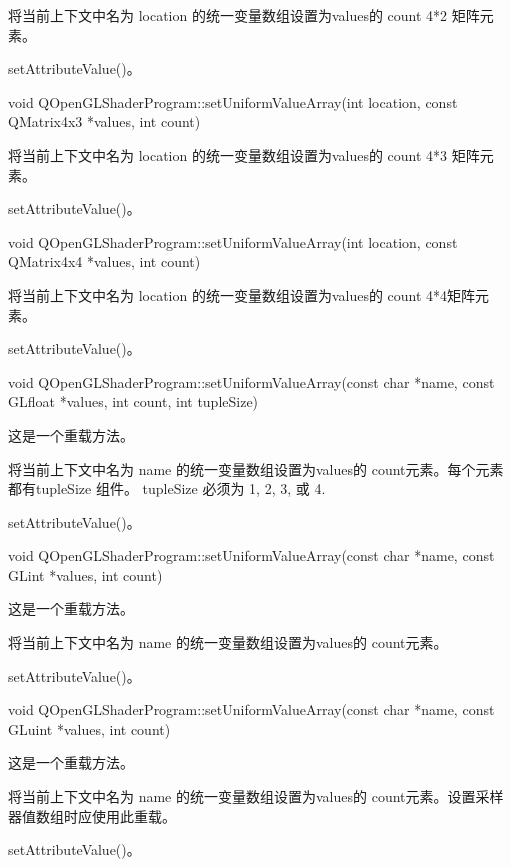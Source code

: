 将当前上下文中名为 location 的统一变量数组设置为values的 count 4*2 矩阵元素。


\begin{seeAlso}
setAttributeValue()。
\end{seeAlso}

void QOpenGLShaderProgram::setUniformValueArray(int location, const QMatrix4x3 *values, int count)

将当前上下文中名为 location 的统一变量数组设置为values的 count 4*3 矩阵元素。

\begin{seeAlso}
setAttributeValue()。
\end{seeAlso}

void QOpenGLShaderProgram::setUniformValueArray(int location, const QMatrix4x4 *values, int count)

将当前上下文中名为 location 的统一变量数组设置为values的 count 4*4矩阵元素。


\begin{seeAlso}
setAttributeValue()。
\end{seeAlso}

void QOpenGLShaderProgram::setUniformValueArray(const char *name, const GLfloat *values, int count, int tupleSize)

这是一个重载方法。

将当前上下文中名为 name 的统一变量数组设置为values的 count元素。每个元素都有tupleSize 组件。 tupleSize 必须为 1, 2, 3, 或 4.

\begin{seeAlso}
setAttributeValue()。
\end{seeAlso}

void QOpenGLShaderProgram::setUniformValueArray(const char *name, const GLint *values, int count)

这是一个重载方法。

将当前上下文中名为 name 的统一变量数组设置为values的 count元素。


\begin{seeAlso}
setAttributeValue()。
\end{seeAlso}

void QOpenGLShaderProgram::setUniformValueArray(const char *name, const GLuint *values, int count)

这是一个重载方法。

将当前上下文中名为 name 的统一变量数组设置为values的 count元素。设置采样器值数组时应使用此重载。

\begin{seeAlso}
setAttributeValue()。
\end{seeAlso}

